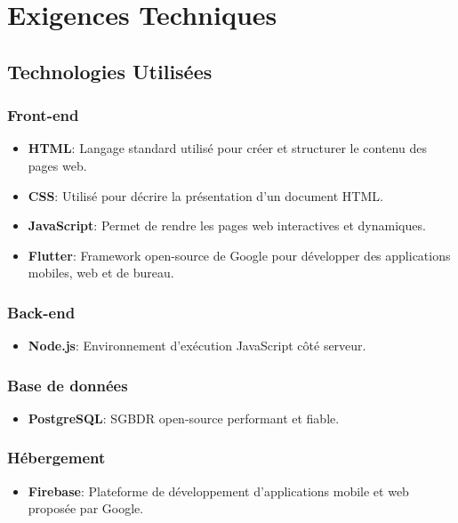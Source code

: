 \documentclass[12pt]{article}
\begin{document}
\section{Exigences Techniques}

\subsection{Technologies Utilisées}

\subsubsection*{Front-end}
\begin{itemize}
    \item \textbf{HTML}: Langage standard utilisé pour créer et structurer le contenu des pages web.
    \item \textbf{CSS}: Utilisé pour décrire la présentation d’un document HTML.
    \item \textbf{JavaScript}: Permet de rendre les pages web interactives et dynamiques.
    \item \textbf{Flutter}: Framework open-source de Google pour développer des applications mobiles, web et de bureau.
\end{itemize}

\subsubsection*{Back-end}
\begin{itemize}
    \item \textbf{Node.js}: Environnement d’exécution JavaScript côté serveur.
\end{itemize}

\subsubsection*{Base de données}
\begin{itemize}
    \item \textbf{PostgreSQL}: SGBDR open-source performant et fiable.
\end{itemize}

\subsubsection*{Hébergement}
\begin{itemize}
    \item \textbf{Firebase}: Plateforme de développement d’applications mobile et web proposée par Google.
\end{itemize}
\end{document}
